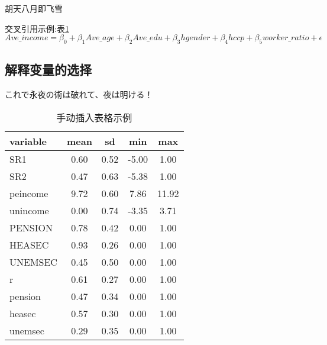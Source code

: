 胡天八月即飞雪

交叉引用示例:表\ref{hhh}
\begin{equation*}
    Ave\_income = \beta_0 + \beta_{1}Ave\_age + \beta_{2}Ave\_edu + \beta_{3}hgender + \beta_{4}hccp + \beta_{5}worker\_ratio + \epsilon
\end{equation*}


\subsection{解释变量的选择}
これで永夜の術は破れて、夜は明ける！
\begin{table}

    \small
    \caption{手动插入表格示例}
    \centering
    \begin{tabular}{lcccc}
        \toprule[1.5bp]
        variable & mean & sd   & min   & max   \\
        \midrule[0.75bp]
        SR1      & 0.60 & 0.52 & -5.00 & 1.00  \\
        SR2      & 0.47 & 0.63 & -5.38 & 1.00  \\
        peincome & 9.72 & 0.60 & 7.86  & 11.92 \\
        unincome & 0.00 & 0.74 & -3.35 & 3.71  \\
        PENSION  & 0.78 & 0.42 & 0.00  & 1.00  \\
        HEASEC   & 0.93 & 0.26 & 0.00  & 1.00  \\
        UNEMSEC  & 0.45 & 0.50 & 0.00  & 1.00  \\
        r        & 0.61 & 0.27 & 0.00  & 1.00  \\
        pension  & 0.47 & 0.34 & 0.00  & 1.00  \\
        heasec   & 0.57 & 0.30 & 0.00  & 1.00  \\
        unemsec  & 0.29 & 0.35 & 0.00  & 1.00  \\
        \bottomrule[1.5bp]
    \end{tabular}
    \label{hhh}
    \vspace{17bp}
\end{table}
